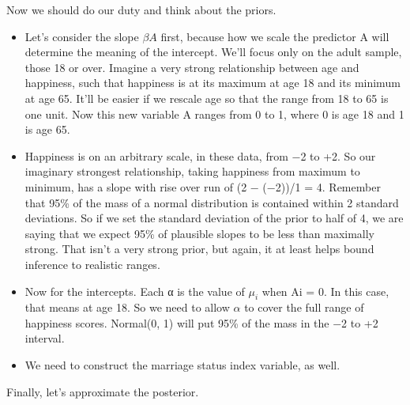 \documentclass[
]{article}
\newenvironment{Shaded}{\begin{snugshade}}{\end{snugshade}}
\newcommand{\CommentTok}[1]{\textcolor[rgb]{0.56,0.35,0.01}{\textit{#1}}}
\newcommand{\DataTypeTok}[1]{\textcolor[rgb]{0.13,0.29,0.53}{#1}}
\newcommand{\DecValTok}[1]{\textcolor[rgb]{0.00,0.00,0.81}{#1}}
\newcommand{\KeywordTok}[1]{\textcolor[rgb]{0.13,0.29,0.53}{\textbf{#1}}}
\newcommand{\NormalTok}[1]{#1}
\newcommand{\OperatorTok}[1]{\textcolor[rgb]{0.81,0.36,0.00}{\textbf{#1}}}
\newcommand{\StringTok}[1]{\textcolor[rgb]{0.31,0.60,0.02}{#1}}
\begin{document}
Now we should do our duty and think about the priors.

\begin{itemize}
\item
  Let's consider the slope \(\beta A\) first, because how we scale the
  predictor A will determine the meaning of the intercept. We'll focus
  only on the adult sample, those 18 or over. Imagine a very strong
  relationship between age and happiness, such that happiness is at its
  maximum at age 18 and its minimum at age 65. It'll be easier if we
  rescale age so that the range from 18 to 65 is one unit. Now this new
  variable A ranges from 0 to 1, where 0 is age 18 and 1 is age 65.
\item
  Happiness is on an arbitrary scale, in these data, from −2 to +2. So
  our imaginary strongest relationship, taking happiness from maximum to
  minimum, has a slope with rise over run of (2 − (−2))/1 = 4. Remember
  that 95\% of the mass of a normal distribution is contained within 2
  standard deviations. So if we set the standard deviation of the prior
  to half of 4, we are saying that we expect 95\% of plausible slopes to
  be less than maximally strong. That isn't a very strong prior, but
  again, it at least helps bound inference to realistic ranges.
\item
  Now for the intercepts. Each α is the value of \(\mu_i\) when Ai = 0.
  In this case, that means at age 18. So we need to allow \(\alpha\) to
  cover the full range of happiness scores. Normal(0, 1) will put 95\%
  of the mass in the −2 to +2 interval.
\item
  We need to construct the marriage status index variable, as well.
\end{itemize}

Finally, let's approximate the posterior.

\begin{Shaded}
\end{Shaded}
\end{document}
